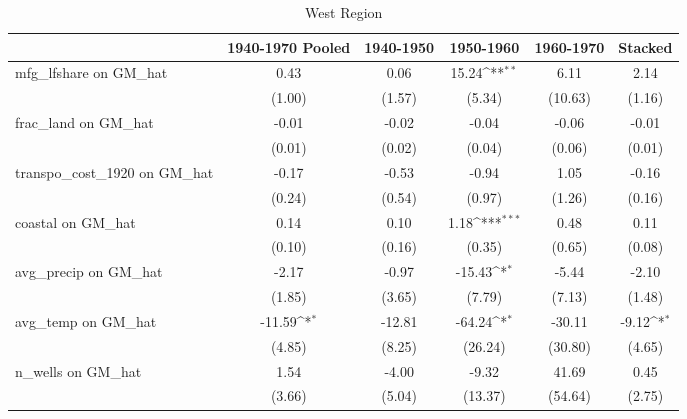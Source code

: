 \begin{table}[htbp]\centering
\def\sym#1{\ifmmode^{#1}\else\(^{#1}\)\fi}
\caption{West Region}
\begin{tabular}{l*{5}{c}}
\toprule
                &\multicolumn{1}{c}{1940-1970 Pooled}&\multicolumn{1}{c}{1940-1950}&\multicolumn{1}{c}{1950-1960}&\multicolumn{1}{c}{1960-1970}&\multicolumn{1}{c}{Stacked}\\
\midrule
mfg\_lfshare on GM\_hat&     0.43         &     0.06         &    15.24\sym{**} &     6.11         &     2.14         \\
                &   (1.00)         &   (1.57)         &   (5.34)         &  (10.63)         &   (1.16)         \\
\addlinespace
frac\_land on GM\_hat&    -0.01         &    -0.02         &    -0.04         &    -0.06         &    -0.01         \\
                &   (0.01)         &   (0.02)         &   (0.04)         &   (0.06)         &   (0.01)         \\
\addlinespace
transpo\_cost\_1920 on GM\_hat&    -0.17         &    -0.53         &    -0.94         &     1.05         &    -0.16         \\
                &   (0.24)         &   (0.54)         &   (0.97)         &   (1.26)         &   (0.16)         \\
\addlinespace
coastal on GM\_hat&     0.14         &     0.10         &     1.18\sym{***}&     0.48         &     0.11         \\
                &   (0.10)         &   (0.16)         &   (0.35)         &   (0.65)         &   (0.08)         \\
\addlinespace
avg\_precip on GM\_hat&    -2.17         &    -0.97         &   -15.43\sym{*}  &    -5.44         &    -2.10         \\
                &   (1.85)         &   (3.65)         &   (7.79)         &   (7.13)         &   (1.48)         \\
\addlinespace
avg\_temp on GM\_hat&   -11.59\sym{*}  &   -12.81         &   -64.24\sym{*}  &   -30.11         &    -9.12\sym{*}  \\
                &   (4.85)         &   (8.25)         &  (26.24)         &  (30.80)         &   (4.65)         \\
\addlinespace
n\_wells on GM\_hat&     1.54         &    -4.00         &    -9.32         &    41.69         &     0.45         \\
                &   (3.66)         &   (5.04)         &  (13.37)         &  (54.64)         &   (2.75)         \\

\end{tabular}
\end{table}
